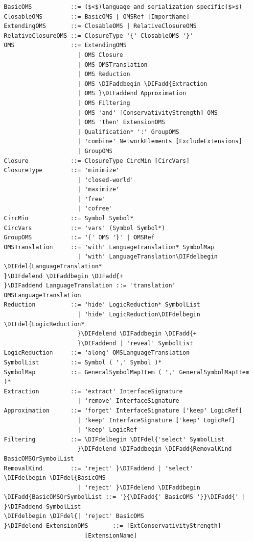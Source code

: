 \documentclass[10pt,fleqn,final]{scrreprt}
\newenvironment{definitions}[0]{\medskip }{}
\providecommand{\DIFadd}[1]{{\protect\color{blue}\uwave{#1}}} %
\providecommand{\DIFdel}[1]{{\protect\color{red}\sout{#1}}}                      %
\providecommand{\DIFaddbegin}{} %
\providecommand{\DIFaddend}{} %
\providecommand{\DIFdelbegin}{} %
\providecommand{\DIFdelend}{} %
\begin{document}
\begin{definitions}
\begin{lstlisting}[language=ebnf,escapeinside={()},mathescape]
BasicOMS           ::= ($<$)language and serialization specific($>$) 
ClosableOMS        ::= BasicOMS | OMSRef [ImportName]
ExtendingOMS       ::= ClosableOMS | RelativeClosureOMS
RelativeClosureOMS ::= ClosureType '{' ClosableOMS '}'
OMS                ::= ExtendingOMS
                     | OMS Closure
                     | OMS OMSTranslation
                     | OMS Reduction
                     | OMS \DIFaddbegin \DIFadd{Extraction
                     | OMS }\DIFaddend Approximation
                     | OMS Filtering
                     | OMS 'and' [ConservativityStrength] OMS
                     | OMS 'then' ExtensionOMS
                     | Qualification* ':' GroupOMS
                     | 'combine' NetworkElements [ExcludeExtensions]
                     | GroupOMS
Closure            ::= ClosureType CircMin [CircVars]
ClosureType        ::= 'minimize'
                     | 'closed-world'
                     | 'maximize'
                     | 'free'
                     | 'cofree'
CircMin            ::= Symbol Symbol*
CircVars           ::= 'vars' (Symbol Symbol*)
GroupOMS           ::= '{' OMS '}' | OMSRef
OMSTranslation     ::= 'with' LanguageTranslation* SymbolMap
                     | 'with' LanguageTranslation\DIFdelbegin \DIFdel{LanguageTranslation*
}\DIFdelend \DIFaddbegin \DIFadd{+
}\DIFaddend LanguageTranslation ::= 'translation' OMSLanguageTranslation
Reduction          ::= 'hide' LogicReduction* SymbolList
                     | 'hide' LogicReduction\DIFdelbegin \DIFdel{LogicReduction*
                     }\DIFdelend \DIFaddbegin \DIFadd{+
                     }\DIFaddend | 'reveal' SymbolList
LogicReduction     ::= 'along' OMSLanguageTranslation
SymbolList         ::= Symbol ( ',' Symbol )*
SymbolMap          ::= GeneralSymbolMapItem ( ',' GeneralSymbolMapItem )*
Extraction         ::= 'extract' InterfaceSignature
                     | 'remove' InterfaceSignature
Approximation      ::= 'forget' InterfaceSignature ['keep' LogicRef]
                     | 'keep' InterfaceSignature ['keep' LogicRef]
                     | 'keep' LogicRef
Filtering          ::= \DIFdelbegin \DIFdel{'select' SymbolList
                     }\DIFdelend \DIFaddbegin \DIFadd{RemovalKind BasicOMSOrSymbolList
RemovalKind        ::= 'reject' }\DIFaddend | 'select'
\DIFdelbegin \DIFdel{BasicOMS
                     | 'reject' }\DIFdelend \DIFaddbegin \DIFadd{BasicOMSOrSymbolList ::= '}{\DIFadd{' BasicOMS '}}\DIFadd{' | }\DIFaddend SymbolList
\DIFdelbegin \DIFdel{| 'reject' BasicOMS
}\DIFdelend ExtensionOMS       ::= [ExtConservativityStrength]
                       [ExtensionName]

\end{lstlisting}
\end{definitions}
\end{document}
